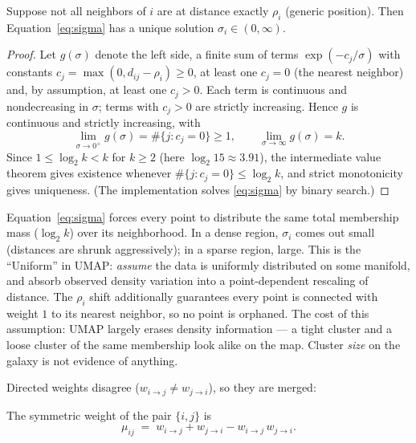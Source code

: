 \begin{lemma}\label{lem:sigma}
Suppose not all neighbors of $i$ are at distance exactly $\rho_i$ (generic
position). Then Equation~\eqref{eq:sigma} has a unique solution
$\sigma_i \in (0, \infty)$.
\end{lemma}

\begin{proof}
Let $g(\sigma)$ denote the left side, a finite sum of terms
$\exp(-c_j / \sigma)$ with constants $c_j = \max(0, d_{ij} - \rho_i) \ge 0$,
at least one $c_j = 0$ (the nearest neighbor) and, by assumption, at least
one $c_j > 0$. Each term is continuous and nondecreasing in $\sigma$; terms
with $c_j > 0$ are strictly increasing. Hence $g$ is continuous and strictly
increasing, with
\[
\lim_{\sigma \to 0^+} g(\sigma) = \#\{j : c_j = 0\} \ge 1,
\qquad
\lim_{\sigma \to \infty} g(\sigma) = k .
\]
Since $1 \le \log_2 k < k$ for $k \ge 2$ (here $\log_2 15 \approx 3.91$),
the intermediate value theorem gives existence whenever
$\#\{j : c_j = 0\} \le \log_2 k$, and strict monotonicity gives uniqueness.
(The implementation solves \eqref{eq:sigma} by binary search.)
\end{proof}

\begin{remark}\label{rem:uniform}
Equation~\eqref{eq:sigma} forces every point to distribute the same total
membership mass ($\log_2 k$) over its neighborhood. In a dense region,
$\sigma_i$ comes out small (distances are shrunk aggressively); in a sparse
region, large. This is the ``Uniform'' in UMAP: \emph{assume} the data is
uniformly distributed on some manifold, and absorb observed density
variation into a point-dependent rescaling of distance. The $\rho_i$ shift
additionally guarantees every point is connected with weight $1$ to its
nearest neighbor, so no point is orphaned. The cost of this assumption:
UMAP largely erases density information --- a tight cluster and a loose
cluster of the same membership look alike on the map. Cluster \emph{size} on
the galaxy is not evidence of anything.
\end{remark}

Directed weights disagree ($w_{i \to j} \neq w_{j \to i}$), so they are
merged:

\begin{definition}\label{def:fuzzyunion}
The symmetric weight of the pair $\{i, j\}$ is
\[
\mu_{ij} \;=\; w_{i \to j} + w_{j \to i} - w_{i \to j}\, w_{j \to i}.
\]
\end{definition}

